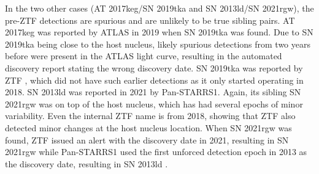 \documentclass[a4paper,oneside,12pt, class=Latex/Classes/PhDthesisPSnPDF, crop=false]{standalone}
\begin{document}
In the two other cases (AT 2017keg/SN 2019tka and SN 2013ld/SN 2021rgw), the pre-ZTF detections are spurious and are unlikely to be true sibling pairs. AT 2017keg was reported by ATLAS in 2019 \citep{2017keg_disc} when SN 2019tka was found. Due to SN 2019tka being close to the host nucleus, likely spurious detections from two years before were present in the ATLAS light curve, resulting in the automated discovery report stating the wrong discovery date. SN 2019tka was reported by ZTF \citep{2019tka_disc}, which did not have such earlier detections as it only started operating in 2018. SN 2013ld was reported in 2021 by Pan-STARRS1. Again, its sibling SN 2021rgw was on top of the host nucleus, which has had several epochs of minor variability. Even the internal ZTF name is from 2018, showing that ZTF also detected minor changes at the host nucleus location. When SN 2021rgw was found, ZTF issued an alert with the discovery date in 2021, resulting in SN 2021rgw \citep{2021rgw_disc} while Pan-STARRS1 used the first unforced detection epoch in 2013 as the discovery date, resulting in SN 2013ld \citep{2013ld_disc}.\\
\end{document}
